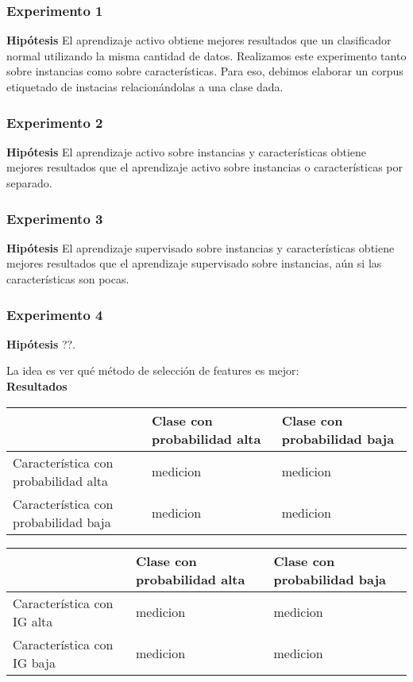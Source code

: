 \subsubsection{Experimento 1}
\textbf{Hipótesis} El aprendizaje activo obtiene mejores resultados que un clasificador normal utilizando la misma cantidad de datos.
Realizamos este experimento tanto sobre instancias como sobre características. Para eso, debimos elaborar un corpus etiquetado de instacias relacionándolas a una clase dada.


\subsubsection{Experimento 2}
\textbf{Hipótesis} El aprendizaje activo sobre instancias y características obtiene mejores resultados que el aprendizaje activo sobre instancias o características por separado.

\subsubsection{Experimento 3}
\textbf{Hipótesis} El aprendizaje supervisado sobre instancias y características obtiene mejores resultados que el aprendizaje supervisado sobre instancias, aún si las características son pocas.


\subsubsection{Experimento 4}
\textbf{Hipótesis} ??.

La idea es ver qué método de selección de features es mejor:\\

\textbf{Resultados}\\

\begin{tabular}{||p{4cm} | l | l||}
\hline
 & Clase con probabilidad alta & Clase con probabilidad baja \\
\hline
Característica con probabilidad alta & medicion & medicion \\
\hline
Característica con probabilidad baja & medicion & medicion \\
\hline
\end{tabular}
\hfill
\begin{tabular}{||p{4cm} | l | l||}
\hline
 & Clase con probabilidad alta & Clase con probabilidad baja \\
\hline
Característica con IG alta & medicion & medicion \\
\hline
Característica con IG baja & medicion & medicion \\
\hline

\end{tabular}




